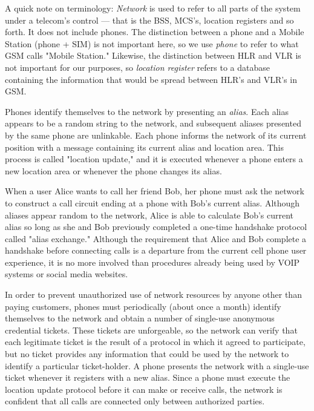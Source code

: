 \documentclass[11pt]{article}
\begin{document}
A quick note on terminology: \emph{Network} is used to refer to all parts of the system under a telecom's control --- that is the BSS, MCS's, location registers and so forth. It does not include phones. The distinction between a phone and a Mobile Station (phone + SIM) is not important here, so we use \emph{phone} to refer to what GSM calls "Mobile Station." Likewise, the distinction between HLR and VLR is not important for our purposes, so \emph{location register} refers to a database containing the information that would be spread between HLR's and VLR's in GSM.

Phones identify themselves to the network by presenting an \emph{alias}. Each alias appears to be a random string to the network, and subsequent aliases presented by the same phone are unlinkable. Each phone informs the network of its current position with a message containing its current alias and location area. This process is called "location update," and it is executed whenever a phone enters a new location area or whenever the phone changes its alias.

When a user Alice wants to call her friend Bob, her phone must ask the network to construct a call circuit ending at a phone with Bob's current alias. Although aliases appear random to the network, Alice is able to calculate Bob's current alias so long as she and Bob previously completed a one-time handshake protocol called "alias exchange." Although the requirement that Alice and Bob complete a handshake before connecting calls is a departure from the current cell phone user experience, it is no more involved than procedures already being used by VOIP systems or social media websites.

In order to prevent unauthorized use of network resources by anyone other than paying customers, phones must periodically (about once a month) identify themselves to the network and obtain a number of single-use anonymous credential tickets. These tickets are unforgeable, so the network can verify that each legitimate ticket is the result of a protocol in which it agreed to participate, but no ticket provides any information that could be used by the network to identify a particular ticket-holder. A phone presents the network with a single-use ticket whenever it registers with a new alias. Since a phone must execute the location update protocol before it can make or receive calls, the network is confident that all calls are connected only between authorized parties.
\end{document}
